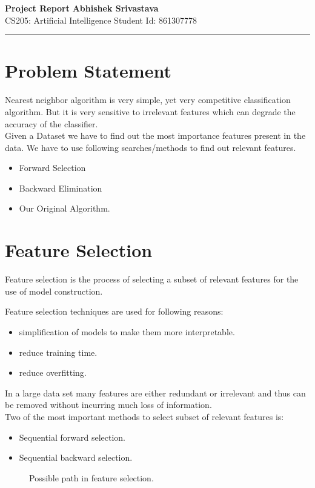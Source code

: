\documentclass[a4paper, 11pt]{article}
\begin{document}
\noindent
\large\textbf{Project Report} \hfill \textbf{Abhishek Srivastava} \\
\normalsize CS205: Artificial Intelligence \hfill Student Id: 861307778 \\
\hrule

\section*{Problem Statement}
Nearest neighbor algorithm is very simple, yet very competitive classification algorithm. But it is very sensitive to irrelevant features which can degrade the accuracy of the classifier.\\
Given a Dataset we have to find out the most importance features present in the data. We have to use following searches/methods to find out relevant features.
\begin{itemize}
	\item Forward Selection \\
	\item Backward Elimination \\
	\item Our Original Algorithm. \\
\end{itemize} 

\section*{Feature Selection}
Feature selection is the process of selecting a subset of relevant features for the use of model construction.\cite{Wiki}

Feature selection techniques are used for following reasons:
\begin{itemize}
	\item simplification of models to make them more interpretable.
	\item reduce training time.
	\item reduce overfitting.
\end{itemize}
In a large data set many features are either redundant or irrelevant and thus can be removed without incurring much loss of information.\\
Two of the most important methods to select subset of relevant features is:
\begin{itemize}
	\item Sequential forward selection.
	\item Sequential backward selection.
\end{itemize}
\begin{figure}
	\centering
	\caption{Possible path in feature selection.}
\end{figure}
\end{document}
